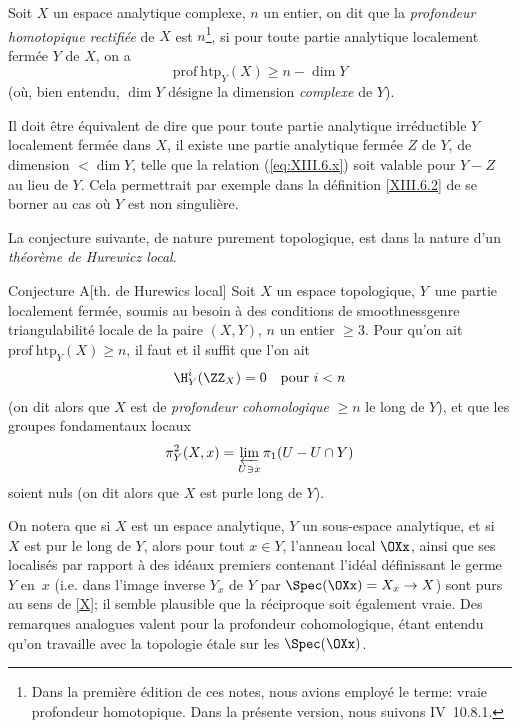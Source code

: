 \begin{supdefinition} \label{XIII.6.2}
Soit $X$ un espace analytique complexe, $n$ un entier, on dit que la \emph{profondeur homotopique rectifiée} de $X$ est $n$\footnote{Dans la premi\`ere \'edition de ces notes, nous avions employ\'e le terme: \og vraie profondeur homotopique\fg. Dans la pr\'esente version, nous suivons \EGA IV~10.8.1.}, si pour toute partie analytique localement ferm\'ee $Y$ de $X$, on a
\begin{equation*} \label{eq:XIII.6.x} \tag{$x$} {\mathrm{prof\:htp}_Y(X)\geq n-\dim Y}
\end{equation*}
(o\`u, bien entendu, $\dim Y$ d\'esigne la dimension \emph{complexe} de $Y$).
\end{supdefinition}

Il doit \^etre \'equivalent de dire que pour toute partie analytique irr\'eductible $Y$ localement ferm\'ee dans $X$, il existe une partie analytique ferm\'ee $Z$ de $Y$, de dimension $<\dim Y$, telle que la relation (\ref{eq:XIII.6.x}) soit valable pour $Y-Z$ au lieu de $Y$. Cela permettrait par exemple dans la d\'efinition \ref{XIII.6.2} de se borner au cas o\`u $Y$ est non singuli\`ere.

\enlargethispage{\baselineskip}%
La conjecture suivante, de nature purement topologique, est dans la nature d'un \og \emph{théorème de Hurewicz local}\fg.

 \label{XIII.6.A}
\begin{enonce*}{Conjecture A}[\og th. de Hurewics local{\fg}\ndemark]
Soit $X$ un espace topologique, $Y$~une partie localement ferm\'ee, soumis au besoin \`a des conditions de \og smoothness\fg genre triangulabilit\'e locale de la paire $(X, Y)$, $n$ un entier $\geq 3$. Pour qu'on ait $\mathrm{prof\:htp}_Y(X)\geq n$, il faut et il suffit que l'on ait
$$
\H^i_Y(\ZZ_X)=0\quad\text{pour } i<n$$
(on dit alors que $X$ est de \emph{profondeur cohomologique} $\geq n$ le long de $Y$), et que les groupes fondamentaux locaux
$$
\pi^2_Y(X, x)=\varprojlim_{U\ni x} \pi_1(U-U\cap Y)$$
soient nuls (on dit alors que $X$ est \og pur\fg le long de $Y$).
\end{enonce*}

On notera que si $X$ est un espace analytique, $Y$ un sous-espace analytique, et si~$X$ est pur le long de $Y$, alors pour tout $x\in Y$, l'anneau local $\OXx$, ainsi que ses localis\'es par rapport \`a des id\'eaux premiers contenant l'id\'eal d\'efinissant le germe~$Y$ en~$x$ (i.e. dans l'image inverse $Y_x$ de $Y$ par $\Spec(\OXx)=X_x\to X$) sont purs au sens de \Exp \ref{X}; il semble plausible que la r\'eciproque soit \'egalement vraie. Des remarques analogues valent pour la profondeur cohomologique, \'etant entendu qu'on travaille avec la topologie \'etale sur les $\Spec(\OXx)$.

